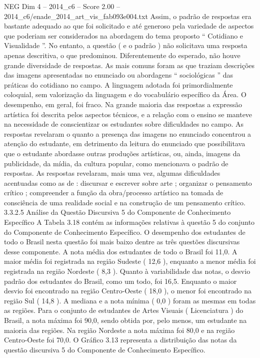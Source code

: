 \begin{textsample}{NEG Dim 4 – 2014\_c6 – Score 2.00 – 2014\_c6/enade\_2014\_art\_vis\_fab093e004.txt}
Assim, o padrão de respostas era bastante adequado ao que foi solicitado e até generoso pela variedade de aspectos que poderiam ser considerados na abordagem do tema proposto “ Cotidiano e Visualidade ”.
No entanto, a questão ( e o padrão ) não solicitava uma resposta apenas descritiva, o que predominou.
Diferentemente do esperado, não houve grande diversidade de respostas.
As mais comuns foram as que traziam descrições das imagens apresentadas no enunciado ou abordagens “ sociológicas ” das práticas do cotidiano no campo.
A linguagem adotada foi primordialmente coloquial, sem valorização da linguagem e do vocabulário específico da Área.
O desempenho, em geral, foi fraco.
Na grande maioria das respostas a expressão artística foi descrita pelos aspectos técnicos, e a relação com o ensino se manteve na necessidade de conscientizar os estudantes sobre dificuldades no campo.
As respostas revelaram o quanto a presença das imagens no enunciado concentrou a atenção do estudante, em detrimento da leitura do enunciado que possibilitava que o estudante abordasse outras produções artísticas, ou, ainda, imagens da publicidade, da mídia, da cultura popular, como mencionava o padrão de respostas.
As respostas revelaram, mais uma vez, algumas dificuldades acentuadas como as de : discursar e escrever sobre arte ; organizar o pensamento crítico ; compreender a função da obra/processo artístico na tomada de consciência de uma realidade social e na construção de um pensamento crítico. 3.3.2.5 Análise da Questão Discursiva 5 do Componente de Conhecimento Específico A Tabela 3.18 contém as informações relativas à questão 5 do conjunto do Componente de Conhecimento Específico.
O desempenho dos estudantes de todo o Brasil nesta questão foi mais baixo dentre as três questões discursivas desse componente.
A nota média dos estudantes de todo o Brasil foi 11,0.
A maior média foi registrada na região Sudeste ( 12,6 ), enquanto a menor média foi registrada na região Nordeste ( 8,3 ).
Quanto à variabilidade das notas, o desvio padrão dos estudantes do Brasil, como um todo, foi 16,5.
Enquanto o maior desvio foi encontrado na região Centro-Oeste ( 18,0 ), o menor foi encontrado na região Sul ( 14,8 ).
A mediana e a nota mínima ( 0,0 ) foram as mesmas em todas as regiões.
Para o conjunto de estudantes de Artes Visuais ( Licenciatura ) do Brasil, a nota máxima foi 90,0, sendo obtida por, pelo menos, um estudante na maioria das regiões.
Na região Nordeste a nota máxima foi 80,0 e na região Centro-Oeste foi 70,0.
O Gráfico 3.13 representa a distribuição das notas da questão discursiva 5 do Componente de Conhecimento Específico.

\end{textsample}
